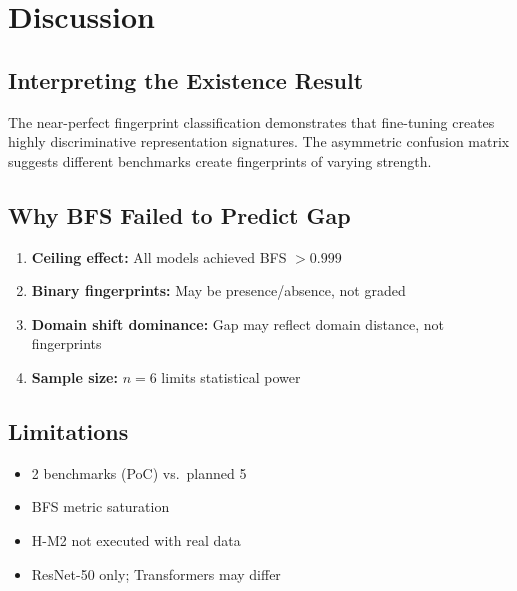 \section{Discussion}
\label{sec:discussion}

\subsection{Interpreting the Existence Result}

The near-perfect fingerprint classification demonstrates that fine-tuning creates highly discriminative representation signatures. The asymmetric confusion matrix suggests different benchmarks create fingerprints of varying strength.

\subsection{Why BFS Failed to Predict Gap}

\begin{enumerate}
    \item \textbf{Ceiling effect:} All models achieved BFS $> 0.999$
    \item \textbf{Binary fingerprints:} May be presence/absence, not graded
    \item \textbf{Domain shift dominance:} Gap may reflect domain distance, not fingerprints
    \item \textbf{Sample size:} $n=6$ limits statistical power
\end{enumerate}

\subsection{Limitations}

\begin{itemize}
    \item 2 benchmarks (PoC) vs.\ planned 5
    \item BFS metric saturation
    \item H-M2 not executed with real data
    \item ResNet-50 only; Transformers may differ
\end{itemize}
